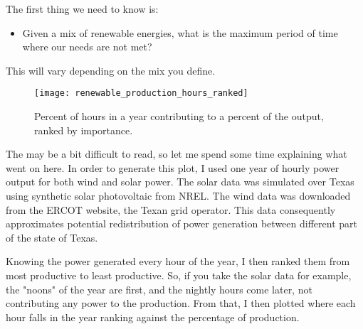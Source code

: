 
The first thing we need to know is:

\begin{itemize}
\item Given a mix of renewable energies, what is the maximum period of time where our needs are not met?
\end{itemize}

This will vary depending on the mix you define.


\begin{figure}[ht]
	\texttt{[image: renewable\_production\_hours\_ranked]}
	\caption[Percent of hours in a year contributing to a percent of the output, ranked by importance]{Percent of hours in a year contributing to a percent of the output, ranked by importance.}
\end{figure}

The  may be a bit difficult to read, so let me spend some time explaining what went on here. In order to generate this plot, I used one year of hourly power output for both wind and solar power. The solar data was simulated over Texas using synthetic solar photovoltaic from NREL. The wind data was downloaded from the ERCOT website, the Texan grid operator. This data consequently approximates potential redistribution of power generation between different part of the state of Texas.

Knowing the power generated every hour of the year, I then ranked them from most productive to least productive. So, if you take the solar data for example, the "noons" of the year are first, and the nightly hours come later, not contributing any power to the production. From that, I then plotted where each hour falls in the year ranking against the percentage of production.

